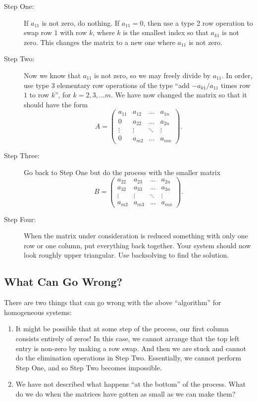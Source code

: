 \documentclass[elementsmain.tex]{subfiles}
\begin{document}
\begin{description}
\item[Step One:] If $a_{11}$ is not zero, do nothing. If $a_{11}=0$, then use a type 2 row operation to swap row $1$ with row $k$, where $k$ is the smallest index so that $a_{k1}$ is not zero. This changes the matrix to a new one where $a_{11}$ is not zero.
\item[Step Two:] Now we know that $a_{11}$ is not zero, so we may freely divide by $a_{11}$. In order, use type 3 elementary row operations of the type ``add $- a_{k1}/a_{11}$ times row $1$ to row $k$'', for $k=2,3,\dots m$. We have now changed the matrix so that it should have the form
\begin{equation*}
A = \begin{pmatrix} a_{11} & a_{12} & \dots & a_{1n} \\
0 & a_{22} & \dots & a_{2n} \\
\vdots & \vdots & \ddots & \vdots\\
0 & a_{m2} & \dots & a_{mn}
\end{pmatrix}.
\end{equation*}
\item[Step Three:] Go back to Step One but do the process with the smaller matrix 
\begin{equation*}
B = \begin{pmatrix} a_{22} & a_{23} & \dots & a_{2n} \\
a_{32} & a_{33} & \dots & a_{3n} \\
\vdots & \vdots & \ddots & \vdots\\
a_{m2} & a_{m3} & \dots & a_{mn}
\end{pmatrix}.
\end{equation*}
\item[Step Four:] When the matrix under consideration is reduced something with only one row or one column, put everything back together. Your system should now look roughly upper triangular. Use backsolving to find the solution.
\end{description}



\subsection*{What Can Go Wrong?}

There are two things that can go wrong with the above ``algorithm'' for homogeneous systems:
\begin{enumerate}
\item It might be possible that at some step of the process, our first column consists entirely of zeros! In this case, we cannot arrange that the top left entry is non-zero by making a row swap. And then we are stuck and cannot do the elimination operations in Step Two. Essentially, we cannot perform Step One, and so Step Two becomes impossible.
\item We have not described what happens ``at the bottom'' of the process. What do we do when the matrices have gotten as small as we can make them?
\end{enumerate}
\end{document}
